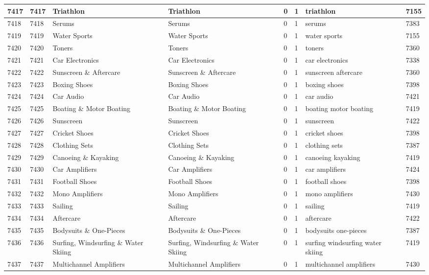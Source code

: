 \begin{longtable}{|l|l|l|l|l|l|l|l|}
7417 & 7417 & Triathlon & Triathlon & 0 & 1 & triathlon & 7155 \\ \hline 
7418 & 7418 & Serums & Serums & 0 & 1 & serums & 7383 \\ \hline 
7419 & 7419 & Water Sports & Water Sports & 0 & 1 & water sports & 7155 \\ \hline 
7420 & 7420 & Toners & Toners & 0 & 1 & toners & 7360 \\ \hline 
7421 & 7421 & Car Electronics & Car Electronics & 0 & 1 & car electronics & 7338 \\ \hline 
7422 & 7422 & Sunscreen \& Aftercare & Sunscreen \& Aftercare & 0 & 1 & sunscreen aftercare & 7360 \\ \hline 
7423 & 7423 & Boxing Shoes & Boxing Shoes & 0 & 1 & boxing shoes & 7398 \\ \hline 
7424 & 7424 & Car Audio & Car Audio & 0 & 1 & car audio & 7421 \\ \hline 
7425 & 7425 & Boating \& Motor Boating & Boating \& Motor Boating & 0 & 1 & boating motor boating & 7419 \\ \hline 
7426 & 7426 & Sunscreen & Sunscreen & 0 & 1 & sunscreen & 7422 \\ \hline 
7427 & 7427 & Cricket Shoes & Cricket Shoes & 0 & 1 & cricket shoes & 7398 \\ \hline 
7428 & 7428 & Clothing Sets & Clothing Sets & 0 & 1 & clothing sets & 7387 \\ \hline 
7429 & 7429 & Canoeing \& Kayaking & Canoeing \& Kayaking & 0 & 1 & canoeing kayaking & 7419 \\ \hline 
7430 & 7430 & Car Amplifiers & Car Amplifiers & 0 & 1 & car amplifiers & 7424 \\ \hline 
7431 & 7431 & Football Shoes & Football Shoes & 0 & 1 & football shoes & 7398 \\ \hline 
7432 & 7432 & Mono Amplifiers & Mono Amplifiers & 0 & 1 & mono amplifiers & 7430 \\ \hline 
7433 & 7433 & Sailing & Sailing & 0 & 1 & sailing & 7419 \\ \hline 
7434 & 7434 & Aftercare & Aftercare & 0 & 1 & aftercare & 7422 \\ \hline 
7435 & 7435 & Bodysuits \& One-Pieces & Bodysuits \& One-Pieces & 0 & 1 & bodysuits one-pieces & 7387 \\ \hline 
7436 & 7436 & Surfing, Windsurfing \& Water Skiing & Surfing, Windsurfing \& Water Skiing & 0 & 1 & surfing windsurfing water skiing & 7419 \\ \hline 
7437 & 7437 & Multichannel Amplifiers & Multichannel Amplifiers & 0 & 1 & multichannel amplifiers & 7430 \\ \hline 

\end{longtable}
